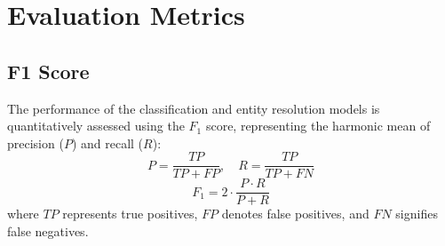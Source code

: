 \section{Evaluation Metrics}
\subsection{F1 Score}
The performance of the classification and entity resolution models is quantitatively assessed using the $F_1$ score, representing the harmonic mean of precision ($P$) and recall ($R$):
\begin{equation}
P = \frac{TP}{TP + FP}, \quad R = \frac{TP}{TP + FN}
\end{equation}
\begin{equation}
F_1 = 2 \cdot \frac{P \cdot R}{P + R}
\end{equation}
where $TP$ represents true positives, $FP$ denotes false positives, and $FN$ signifies false negatives.
